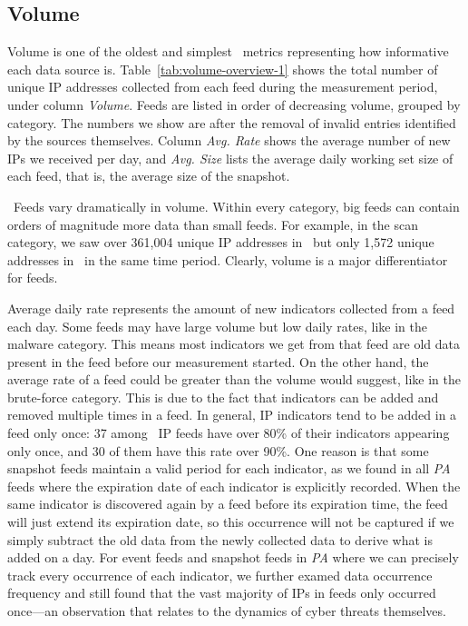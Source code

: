 \subsection{Volume}
\label{sec:ip-volume}

Volume is one of the oldest and simplest \ti\ metrics representing how informative
each data source is. Table~\ref{tab:volume-overview-1} shows the total number of unique IP addresses
collected from each feed during the measurement period, under column \emph{Volume}.
Feeds are listed in order of decreasing volume, grouped by category.
The numbers we show are after the removal of invalid entries identified
by the sources themselves. Column \emph{Avg. Rate} shows the average number of
new IPs we received per day, and \emph{Avg. Size} lists the average daily
working set size of each feed, that is, the average size of the snapshot.

\finding\ Feeds vary dramatically in volume. Within every category, big feeds can contain
orders of magnitude more data than small feeds. For example, in the scan category, we saw
over 361,004 unique IP addresses in \feeddshield\ but only 1,572 unique addresses
in \feedTSAnalyst\ in the same time period. Clearly, volume is a major differentiator
for feeds. %




Average daily rate represents the amount of new indicators collected from a feed each day.
Some feeds may have large volume but low daily rates, like {\feedfeodo} in the malware
category. This means most indicators we get from that feed are old data present in the feed before our
measurement started. On the other hand, the average rate of a feed could be
greater than the volume would suggest, like {\feednothink} in the brute-force category.
This is due to the fact that indicators can be added and removed multiple times in a
feed. In general, IP indicators tend to be added in a feed only once: 37 among \numipfeeds\
IP feeds have over 80\% of their indicators appearing only once, and 30 of them have this rate over 90\%.
One reason is that some snapshot feeds maintain a valid period for each indicator, as
we found in all \emph{PA} feeds where the expiration date of each indicator is explicitly
recorded. When the same indicator is discovered again by a feed before its expiration time,
the feed will just extend its expiration date, so this occurrence will not be captured
if we simply subtract the old data from the newly collected data to derive what is added on a day.
For event feeds and snapshot feeds in \emph{PA} where we can precisely track every occurrence
of each indicator, we further examed data occurrence frequency and still found that the vast
majority of IPs in feeds only occurred once---an observation that relates to the dynamics
of cyber threats themselves.


